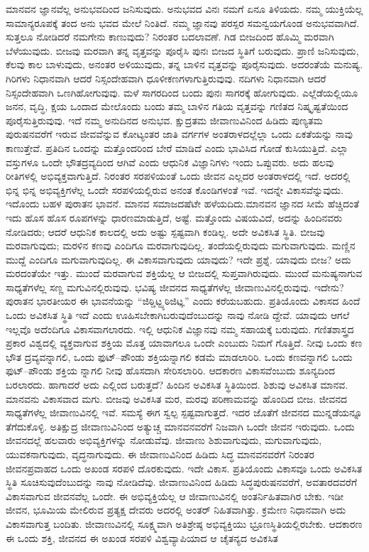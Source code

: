 ಮಾನವನ ಜ್ಞಾನವೆಲ್ಲ ಅನುಭವದಿಂದ ಜನಿಸುವುದು. ಅನುಭವದ ವಿನಃ ನಮಗೆ ಏನೂ ತಿಳಿಯದು. ನಮ್ಮ ಯುಕ್ತಿಯೆಲ್ಲ ಸಾಮಾನ್ಯರೂಪಕ್ಕೆ ತಂದ ಅನು ಭವದ ಮೇಲೆ ನಿಂತಿದೆ. ನಮ್ಮ ಜ್ಞಾನವು ಪರಸ್ಪರ ಸಮನ್ವಯಗೊಂಡ ಅನುಭವವಾಗಿದೆ. ಸುತ್ತಲೂ ನೋಡಿದರೆ ನಮಗೇನು ಕಾಣುವುದು? ನಿರಂತರ ಬದಲಾವಣೆ. ಗಿಡ ಬೀಜದಿಂದ ಹೊಮ್ಮಿ ಮರವಾಗಿ ಬೆಳೆಯುವುದು. ಬೀಜವು ಮರವಾಗಿ ತನ್ನ ವೃತ್ತವನ್ನು ಪೂರೈಸಿ ಪುನಃ ಬೀಜದ ಸ್ಥಿತಿಗೆ ಬರುವುದು. ಪ್ರಾಣಿ ಜನಿಸುವುದು, ಕೆಲವು ಕಾಲ ಬಾಳುವುದು, ಅನಂತರ ಅಳಿಯುವುದು, ತನ್ನ ಬಾಳಿನ ವೃತ್ತವನ್ನು ಪೂರೈಸುವುದು. ಅದರಂತೆಯೆ ಮನುಷ್ಯ. ಗಿರಿಗಳು ನಿಧಾನವಾಗಿ ಆದರೆ ನಿಸ್ಸಂದೇಹವಾಗಿ ಧೂಳೀಕಣಗಳಾಗುತ್ತಿರುವುವು. ನದಿಗಳು ನಿಧಾನವಾಗಿ ಆದರೆ ನಿಸ್ಸಂದೇಹವಾಗಿ ಒಣಗಿಹೋಗುವುವು. ಮಳೆ ಸಾಗರದಿಂದ ಬಂದು ಪುನಃ ಸಾಗರಕ್ಕೆ ಹೋಗುವುದು. ಎಲ್ಲೆಡೆಯಲ್ಲಿಯೂ ಜನನ, ವೃದ್ಧಿ, ಕ್ಷಯ ಒಂದಾದ ಮೇಲೊಂದು ಬಂದು ತಮ್ಮ ಬಾಳಿನ ಗತಿಯ ವೃತ್ತವನ್ನು ಗಣಿತದ ನಿಷ್ಕೃಷ್ಟತೆಯಿಂದ ಪೂರೈಸುತ್ತಿರುವುವು. ಇದೆ ನಮ್ಮ ಅನುದಿನದ ಅನುಭವ. ಕ್ಷುದ್ರತಮ ಜೀವಾಣುವಿನಿಂದ ಹಿಡಿದು ಪುಣ್ಯತಮ ಪುರುಷನವರೆಗೆ ಇರುವ ಜೀವವೆನ್ನುವ ಕೋಟ್ಯಂತರ ಜಾತಿ ವರ್ಗಗಳ ಅಂತರಾಳದಲ್ಲೆಲ್ಲಾ ಒಂದು ಏಕತೆಯನ್ನು ನಾವು ಕಾಣುತ್ತೇವೆ. ಪ್ರತಿದಿನ ಒಂದನ್ನು ಮತ್ತೊಂದರಿಂದ ಬೇರೆ ಮಾಡಿದೆ ಎಂದು ಭಾವಿಸಿದ ಗೋಡೆ ಕುಸಿಯುತ್ತಿದೆ. ಎಲ್ಲಾ ವಸ್ತುಗಳೂ ಒಂದೇ ಭೌತದ್ರವ್ಯದಿಂದ ಆಗಿವೆ ಎಂದು ಆಧುನಿಕ ವಿಜ್ಞಾನಿಗಳು ಇಂದು ಒಪ್ಪುವರು. ಅದು ಹಲವು ರೀತಿಗಳಲ್ಲಿ ಅಭಿವ್ಯಕ್ತವಾಗುತ್ತಿದೆ. ನಿರಂತರ ಸರಪಳಿಯಂತೆ ಒಂದು ಜೀವನ ಎಲ್ಲದರ ಅಂತರಾಳದಲ್ಲಿ ಇದೆ. ಅದರಲ್ಲಿ ಭಿನ್ನ ಭಿನ್ನ ಅಭಿವ್ಯಕ್ತಿಗಳೆಲ್ಲ ಒಂದೇ ಸರಪಳಿಯಲ್ಲಿರುವ ಅನಂತ ಕೊಂಡಿಗಳಂತೆ ಇವೆ. ಇದನ್ನೇ ವಿಕಾಸವೆನ್ನುವುದು. ಇದೊಂದು ಬಹಳ ಪುರಾತನ ಭಾವನೆ. ಮಾನವ ಸಮಾಜದಷೆಟೇ ಹಳೆಯದಿದು.ಮಾನವನ ಜ್ಞಾನದ ಸೀಮೆ ಹೆಚ್ಚಿದಂತೆ ಇದು ಹೊಸ ಹೊಸ ರೂಪಗಳನ್ನು ಧಾರಣಮಾಡುತ್ತಿದೆ, ಅಷ್ಟೆ. ಮತ್ತೊಂದು ವಿಷಯವಿದೆ, ಅದನ್ನು ಹಿಂದಿನವರು ನೋಡಿದರು; ಆದರೆ ಆಧುನಿಕ ಕಾಲದಲ್ಲಿ ಅದು ಅಷ್ಟು ಸ್ಪಷ್ಟವಾಗಿ ಕಂಡಿಲ್ಲ. ಅದೇ ಅವಿಕಸಿತ ಸ್ಥಿತಿ. ಬೀಜವು ಮರವಾಗುವುದು; ಮರಳಿನ ಕಣವು ಎಂದಿಗೂ ಮರವಾಗುವುದಿಲ್ಲ. ತಂದೆಯಲ್ಲಿರುವುದು ಮಗುವಾಗುವುದು. ಮಣ್ಣಿನ ಮುದ್ದೆ ಎಂದಿಗೂ ಮಗುವಾಗುವುದಿಲ್ಲ. ಈ ವಿಕಾಸವಾಗುವುದು ಯಾವುದು? ಇದೇ ಪ್ರಶ್ನೆ. ಯಾವುದು ಬೀಜ? ಅದು ಮರದಂತೆಯೇ ಇತ್ತು. ಮುಂದೆ ಮರವಾಗುವ ಶಕ್ತಿಯೆಲ್ಲ ಆ ಬೀಜದಲ್ಲಿ ಸುಪ್ತವಾಗಿರುವುದು. ಮುಂದೆ ಮನುಷ್ಯನಾಗುವ ಸಾಧ್ಯತೆಗಳೆಲ್ಲ ಸಣ್ಣ ಮಗುವಿನಲ್ಲಿರುವುವು. ಭವಿಷ್ಯ ಜೀವನದ ಸಾಧ್ಯತೆಗಳೆಲ್ಲ ಜೀವಾಣುವಿನಲ್ಲಿರುವುವು. ಇದೇನು? ಪುರಾತನ ಭಾರತೀಯರ ಈ ಭಾವನೆಯನ್ನು “ಜಿಠ್ಡಿಟ್ಝ್ಠಠಿಜಿಟ್ಞ” ಎಂದು ಕರೆಯಬಹುದು. ಪ್ರತಿಯೊಂದು ವಿಕಾಸದ ಹಿಂದೆ ಒಂದು ಅವಿಕಸಿತ ಸ್ಥಿತಿ ಇದೆ ಎಂದು ಊಹಿಸಬೇಕಾಗಿಬರುವುದೆಂಬುದನ್ನು ನಾವು ನೋಡಿ ದ್ದೇವೆ. ಯಾವುದು ಆಗಲೆ ಇಲ್ಲವೊ ಅದೆಂದಿಗೂ ವಿಕಾಸವಾಗಲಾರದು. ಇಲ್ಲಿ ಆಧುನಿಕ ವಿಜ್ಞಾನವು ನಮ್ಮ ಸಹಾಯಕ್ಕೆ ಬರುವುದು. ಗಣಿತಶಾಸ್ತ್ರದ ಪ್ರಕಾರ ವಿಶ್ವದಲ್ಲಿ ವ್ಯಕ್ತವಾಗುವ ಶಕ್ತಿಯ ಮೊತ್ತ ಯಾವಾಗಲೂ ಒಂದೇ ಎಂಬುದು ನಿಮಗೆ ಗೊತ್ತಿದೆ. ನೀವು ಒಂದು ಕಣ ಭೌತ ದ್ರವ್ಯವನ್ನಾಗಲಿ, ಒಂದು ಫುಟ್​–ಪೌಂಡು ಶಕ್ತಿಯನ್ನಾಗಲಿ ಕಡಮೆ ಮಾಡಲಾರಿರಿ. ಒಂದು ಕಣವನ್ನಾಗಲಿ ಒಂದು ಫುಟ್​–ಪೌಂಡು ಶಕ್ತಿಯ ನ್ನಾಗಲಿ ನೀವು ಹೊಸದಾಗಿ ಸೇರಿಸಲಾರಿರಿ. ಆದಕಾರಣ ವಿಕಾಸವೆಂಬುದು ಶೂನ್ಯದಿಂದ ಬರಲಾರದು. ಹಾಗಾದರೆ ಅದು ಎಲ್ಲಿಂದ ಬರುತ್ತದೆ? ಹಿಂದಿನ ಅವಿಕಸಿತ ಸ್ಥಿತಿಯಿಂದ. ಶಿಶುವು ಅವಿಕಸಿತ ಮಾನವ. ಮಾನವನು ವಿಕಾಸವಾದ ಮಗು. ಬೀಜವು ಅವಿಕಸಿತ ಮರ, ಮರವು ಪರಿಣಾಮವನ್ನು ಹೊಂದಿದ ಬೀಜ. ಜೀವನದ ಸಾಧ್ಯತೆಗಳೆಲ್ಲ ಜೀವಾಣುವಿನಲ್ಲಿ ಇವೆ. ಸಮಸ್ಯೆ ಈಗ ಸ್ವಲ್ಪ ಸ್ಪಷ್ಟವಾಗುತ್ತದೆ. ಇದರ ಜೊತೆಗೆ ಜೀವನದ ಮುನ್ನಡೆಯನ್ನೂ ತೆಗೆದುಕೊಳ್ಳಿ. ಅತಿಕ್ಷುದ್ರ ಜೀವಾಣುವಿನಿಂದ ಅತ್ಯುಚ್ಚ ಮಾನವನವರೆಗೆ ನಿಜವಾಗಿ ಒಂದೇ ಜೀವನ ಇರುವುದು. ಒಂದು ಜೀವನದಲ್ಲೆ ಹಲವಾರು ಅಭಿವ್ಯಕ್ತಿಗಳನ್ನು ನೋಡುವೆವು. ಜೀವಾಣು ಶಿಶುವಾಗುವುದು, ಮಗುವಾಗುವುದು, ಯುವಕನಾಗುವುದು, ವೃದ್ಧನಾಗುವುದು. ಈ ಜೀವಾಣುವಿನಿಂದ ಹಿಡಿದು ಸಿದ್ಧ ಮಾನವನವರೆಗೆ ನಿರಂತರ ಜೀವನಪ್ರವಾಹದ ಒಂದು ಅಖಂಡ ಸರಪಳಿ ದೊರಕುವುದು. ಇದೇ ವಿಕಾಸ. ಪ್ರತಿಯೊಂದು ವಿಕಾಸವೂ ಒಂದು ಅವಿಕಸಿತ ಸ್ಥಿತಿ ಸೂಚಿಸುವುದೆಂಬುದನ್ನು ನಾವು ನೋಡಿದೆವು. ಜೀವಾಣುವಿನಿಂದ ಹಿಡಿದು ಸಿದ್ಧಪುರುಷನವರೆಗೆ, ಅವತಾರದವರೆಗೆ ವಿಕಾಸವಾಗುವ ಜೀವನವೆಲ್ಲ ಒಂದೇ. ಈ ಅಭಿವ್ಯಕ್ತಿಯೆಲ್ಲ ಆ ಜೀವಾಣುವಿನಲ್ಲಿ ಅಂತರ್ನಿಹಿತವಾಗಿರ ಬೇಕು. ಇಡೀ ಜೀವನ, ಭೂಮಿಯ ಮೇಲಿರುವ ಪ್ರತ್ಯಕ್ಷ ದೇವರು ಅದರಲ್ಲಿ ಅಂತರ್ ನಿಹಿತವಾಗಿತ್ತು. ಕ್ರಮೇಣ ನಿಧಾನವಾಗಿ ಅದು ವಿಕಾಸವಾಗುತ್ತ ಬಂದಿತು. ಜೀವಾಣುವಿನಲ್ಲಿ ಸೂಕ್ಷ್ಮವಾಗಿ ಅತಿಶ್ರೇಷ್ಠ ಅಭಿವ್ಯಕ್ತಿಯು ಭ್ರೂಣಸ್ಥಿತಿಯಲ್ಲಿರಬೇಕು. ಆದಕಾರಣ ಈ ಒಂದು ಶಕ್ತಿ, ಜೀವನದ ಈ ಅಖಂಡ ಸರಪಳಿ ವಿಶ್ವವ್ಯಾಪಿಯಾದ ಆ ಚೈತನ್ಯದ ಅವಿಕಸಿತ 